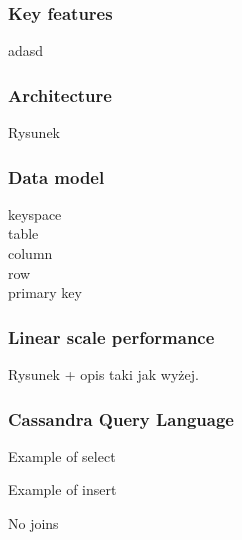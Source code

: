 \subsubsection{Key features}
\begin{enumerate*}
\item adasd
\end{enumerate*}

\subsubsection{Architecture}

Rysunek

\subsubsection{Data model}
\begin{description}
\item[keyspace]
\item[table]
\item[column]
\item[row]
\item[primary key]
\end{description}

\subsubsection{Linear scale performance}

Rysunek + opis taki jak wyżej.

\subsubsection{Cassandra Query Language}
Example of select

Example of insert

No joins

